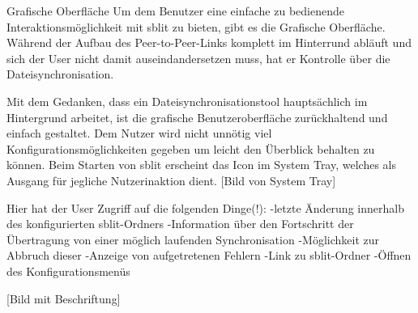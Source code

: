 Grafische Oberfläche
Um dem Benutzer eine einfache zu bedienende Interaktionsmöglichkeit mit sblit zu bieten, gibt es die Grafische Oberfläche. Während der Aufbau des Peer-to-Peer-Links  komplett im Hinterrund abläuft und sich der User nicht damit auseindandersetzen muss, hat er Kontrolle über die Dateisynchronisation.

Mit dem Gedanken, dass ein Dateisynchronisationstool hauptsächlich im Hintergrund arbeitet, ist die grafische Benutzeroberfläche zurückhaltend und einfach gestaltet. Dem Nutzer wird nicht unnötig viel Konfigurationsmöglichkeiten gegeben um leicht den Überblick behalten zu können. 
Beim Starten von sblit erscheint das Icon im System Tray, welches als Ausgang für jegliche Nutzerinaktion dient.
[Bild von System Tray]

Hier hat der User Zugriff auf die folgenden Dinge(!):
-letzte Änderung innerhalb des konfigurierten sblit-Ordners
-Information über den Fortschritt der Übertragung von einer möglich laufenden Synchronisation
-Möglichkeit zur Abbruch dieser
-Anzeige von aufgetretenen Fehlern
-Link zu sblit-Ordner
-Öffnen des Konfigurationsmenüs

[Bild mit Beschriftung]

